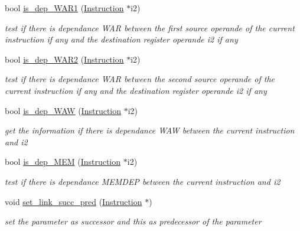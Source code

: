 \begin{DoxyCompactItemize}
\begin{DoxyCompactList}
 \end{DoxyCompactList}\item 
bool \mbox{\hyperlink{class_instruction_a36c0faedd74af14b403ba7063af5d07f}{is\+\_\+dep\+\_\+\+W\+A\+R1}} (\mbox{\hyperlink{class_instruction}{Instruction}} $\ast$i2)
\begin{DoxyCompactList}\small\item\em test if there is dependance W\+AR between the first source operande of the current instruction if any and the destination register operande i2 if any \end{DoxyCompactList}\item 
bool \mbox{\hyperlink{class_instruction_a04471df677984f67ec13de88f55e3703}{is\+\_\+dep\+\_\+\+W\+A\+R2}} (\mbox{\hyperlink{class_instruction}{Instruction}} $\ast$i2)
\begin{DoxyCompactList}\small\item\em test if there is dependance W\+AR between the second source operande of the current instruction if any and the destination register operande i2 if any ~\newline
 \end{DoxyCompactList}\item 
bool \mbox{\hyperlink{class_instruction_a30c159faa5c462bb2c7ae7562c9c8254}{is\+\_\+dep\+\_\+\+W\+AW}} (\mbox{\hyperlink{class_instruction}{Instruction}} $\ast$i2)
\begin{DoxyCompactList}\small\item\em get the information if there is dependance W\+AW between the current instruction and i2 ~\newline
 \end{DoxyCompactList}\item 
bool \mbox{\hyperlink{class_instruction_a28526bda91b964d7fd81f85cee02c624}{is\+\_\+dep\+\_\+\+M\+EM}} (\mbox{\hyperlink{class_instruction}{Instruction}} $\ast$i2)
\begin{DoxyCompactList}\small\item\em test if there is dependance M\+E\+M\+D\+EP between the current instruction and i2 ~\newline
 \end{DoxyCompactList}\item 
\mbox{\label{class_instruction_ab8f6e21bc94df2198678a3cdbcfaa12e}} 
void \mbox{\hyperlink{class_instruction_ab8f6e21bc94df2198678a3cdbcfaa12e}{set\+\_\+link\+\_\+succ\+\_\+pred}} (\mbox{\hyperlink{class_instruction}{Instruction}} $\ast$)
\begin{DoxyCompactList}\small\item\em set the parameter as successor and this as predecessor of the parameter \end{DoxyCompactList}\item 

\end{DoxyCompactItemize}
